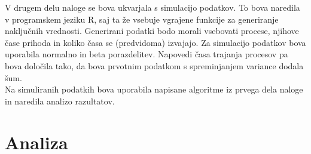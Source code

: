 \documentclass[a4paper, pt14]{article}
\begin{document}
V drugem delu naloge se bova ukvarjala s simulacijo podatkov. To bova naredila v programskem jeziku R, saj ta že vsebuje vgrajene funkcije za generiranje naključnih vrednosti.
Generirani podatki bodo morali vsebovati procese, njihove čase prihoda in koliko časa se (predvidoma) izvajajo.
Za simulacijo podatkov bova uporabila normalno in beta porazdelitev. 
Napovedi časa trajanja procesov pa bova določila tako, da bova prvotnim podatkom s spreminjanjem variance dodala šum. \\
Na simuliranih podatkih bova uporabila napisane algoritme iz prvega dela naloge in naredila analizo razultatov.

\section{Analiza}
\end{document}
